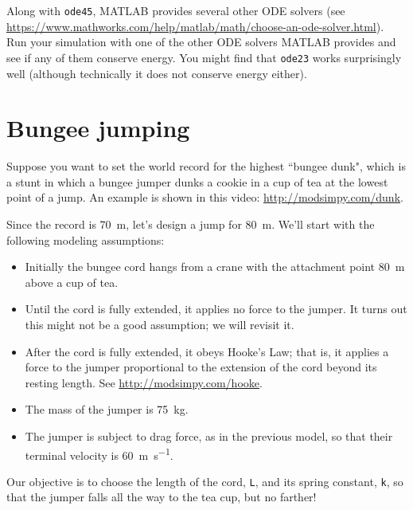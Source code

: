 \documentclass[
]{book}
\numberwithin{Answer}{chapter}
\numberwithin{Exercise}{chapter}
\begin{document}
Along with {\tt ode45}, MATLAB provides several other ODE solvers (see \url{https://www.mathworks.com/help/matlab/math/choose-an-ode-solver.html}).
Run your simulation with one of the other ODE solvers MATLAB provides
and see if any of them conserve energy.  You might find that {\tt ode23} works surprisingly well (although technically it does not conserve energy either).


\section{Bungee jumping}
\label{bungee}


Suppose you want to set the world record for the highest ``bungee dunk", which is a stunt in which a bungee jumper dunks a cookie in a cup of tea at the lowest point of a jump.  An example is shown in this video: \url{http://modsimpy.com/dunk}.

Since the record is \SI{70}{\meter}, let's design a jump for \SI{80}{\meter}.  We'll start with the following modeling assumptions:

\begin{itemize}

\item  Initially the bungee cord hangs from a crane with the attachment point \SI{80}{\meter} above a cup of tea.

\item Until the cord is fully extended, it applies no force to the jumper.  It turns out this might not be a good assumption; we will revisit it.

\item After the cord is fully extended, it obeys Hooke's Law; that is, it applies a force to the jumper proportional to the extension of the cord beyond its resting length.  See \url{http://modsimpy.com/hooke}. 

\item The mass of the jumper is \SI{75}{\kilogram}.

\item The jumper is subject to drag force, as in the previous model, so that their terminal velocity is \SI{60}{\meter \per \second}.

\end{itemize}

Our objective is to choose the length of the cord, {\tt L}, and its spring constant, {\tt k}, so that the jumper falls all the way to the tea cup, but no farther!
\end{document}
